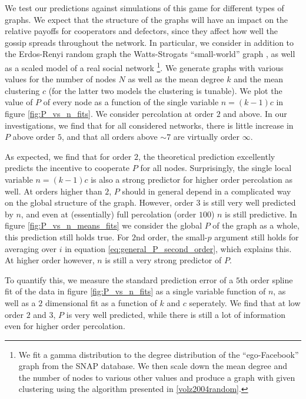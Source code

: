 \documentclass{article}
\renewcommand{\=}[1]{\stackrel{#1}{=}} %
\begin{document}
We test our predictions against simulations of this game for different types of graphs. We expect that the structure of the graphs will have an impact on the relative payoffs for cooperators and defectors, since they affect how well the gossip spreads throughout the network. In particular, we consider in addition to the Erdos-Renyi random graph the Watts-Strogats ``small-world'' graph \cite{watts1998collective}, as well as a scaled model of a real social network \cite{snapnets}\footnote{We fit a gamma distribution to the degree distribution of the ``ego-Facebook'' graph from the SNAP database. We then scale down the mean degree and the number of nodes to various other values and produce a graph with given clustering using the algorithm presented in \ref{volz2004random}.}. We generate graphs with various values for the number of nodes $N$ as well as the mean degree $k$ and the mean clustering $c$ (for the latter two models the clustering is tunable). We plot the value of $P$ of every node as a function of the single variable $n = (k-1)c$ in figure \ref{fig:P_vs_n_fits}. We consider percolation at order $2$ and above. In our investigations, we find that for all considered networks, there is little increase in $P$ above order $5$, and that all orders above $\sim 7$ are virtually order $\infty$. 

As expected, we find that for order $2$, the theoretical prediction excellently predicts the incentive to cooperate $P$ for all nodes. Surprisingly, the single local variable $n = (k-1)c$ is also a strong predictor for higher order percolation as well. At orders higher than $2$, $P$ should in general depend in a complicated way on the global structure of the graph. However, order $3$ is still very well predicted by $n$, and even at (essentially) full percolation (order $100$) $n$ is still predictive. In figure \ref{fig:P_vs_n_means_fits} we consider the global $P$ of the graph as a whole, this prediction still holds true. For $2$nd order, the small-$p$ argument still holds for averaging over $i$ in equation \ref{eq:general_P_second_order}, which explains this. At higher order however, $n$ is still a very strong predictor of $P$.

To quantify this, we measure the standard prediction error of a $5$th order spline fit of the data in figure \ref{fig:P_vs_n_fits} as a single variable function of $n$, as well as a $2$ dimensional fit as a function of $k$ and $c$ seperately. We find that at low order $2$ and $3$, $P$ is very well predicted, while there is still a lot of information even for higher order percolation.
\end{document}
